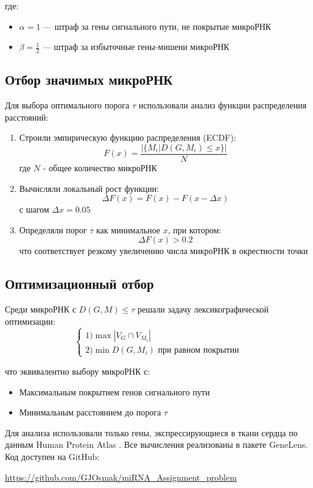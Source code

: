 где:
\begin{itemize}
    \item $\alpha = 1$ --- штраф за гены сигнального пути, не покрытые микроРНК
    \item $\beta = \frac{1}{2}$ --- штраф за избыточные гены-мишени микроРНК
\end{itemize}

\subsection{Отбор значимых микроРНК}
Для выбора оптимального порога $\tau$ использовали анализ функции распределения расстояний:

\begin{enumerate}
    \item Строили эмпирическую функцию распределения (ECDF):
    \begin{equation}
    F(x) = \frac{|\{M_i | D(G,M_i) \leq x\}|}{N}
    \end{equation}
    где $N$ - общее количество микроРНК
    
    \item Вычисляли локальный рост функции:
    \begin{equation}
    \Delta F(x) = F(x) - F(x - \Delta x)
    \end{equation}
    с шагом $\Delta x = 0.05$
    
    \item Определяли порог $\tau$ как минимальное $x$, при котором:
    \begin{equation}
    \Delta F(x) > 0.2
    \end{equation}
    что соответствует резкому увеличению числа микроРНК в окрестности точки
\end{enumerate}

\subsection{Оптимизационный отбор}
Среди микроРНК с $D(G,M) \leq \tau$ решали задачу лексикографической оптимизации:
\begin{equation*}
    \begin{cases}
    1) \max |V_G \cap V_{M_i}| \\
    2) \min D(G,M_i) \text{ при равном покрытии}
    \end{cases}
\end{equation*}

что эквивалентно выбору микроРНК с:
\begin{itemize}
    \item Максимальным покрытием генов сигнального пути
    \item Минимальным расстоянием до порога $\tau$
\end{itemize}

Для анализа использовали только гены, экспрессирующиеся в ткани сердца по данным Human Protein Atlas \cite{osmak2020mirna}. Все вычисления реализованы в пакете GeneLens. Код доступен на GitHub:

\url{https://github.com/GJOsmak/miRNA_Assignment_problem}